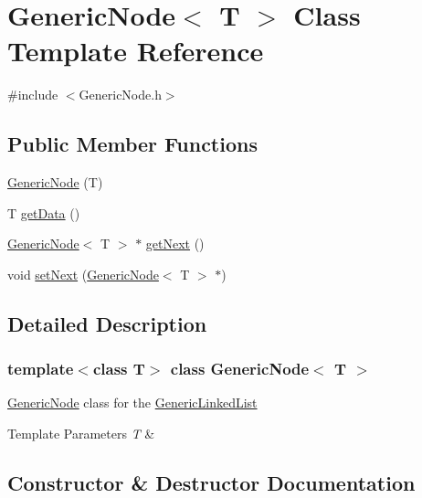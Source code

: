 \hypertarget{class_generic_node}{}\section{Generic\+Node$<$ T $>$ Class Template Reference}
\label{class_generic_node}


{\ttfamily \#include $<$Generic\+Node.\+h$>$}

\subsection*{Public Member Functions}
\begin{DoxyCompactItemize}
\item 
\mbox{\hyperlink{class_generic_node_ac5a803402a095cf8510b10a2574a2481}{Generic\+Node}} (T)
\item 
T \mbox{\hyperlink{class_generic_node_a77f64973b12b7c7e2b6707e0b9e9a464}{get\+Data}} ()
\item 
\mbox{\hyperlink{class_generic_node}{Generic\+Node}}$<$ T $>$ $\ast$ \mbox{\hyperlink{class_generic_node_a0e6e224f6c52b0bf9e09264185e4976a}{get\+Next}} ()
\item 
void \mbox{\hyperlink{class_generic_node_affb24675a4b0b2469360a62fab95e7f7}{set\+Next}} (\mbox{\hyperlink{class_generic_node}{Generic\+Node}}$<$ T $>$ $\ast$)
\end{DoxyCompactItemize}


\subsection{Detailed Description}
\subsubsection*{template$<$class T$>$\newline
class Generic\+Node$<$ T $>$}

\mbox{\hyperlink{class_generic_node}{Generic\+Node}} class for the \mbox{\hyperlink{class_generic_linked_list}{Generic\+Linked\+List}} 
\begin{DoxyTemplParams}{Template Parameters}
{\em T} & \\
\hline
\end{DoxyTemplParams}


\subsection{Constructor \& Destructor Documentation}
\mbox{\label{class_generic_node_ac5a803402a095cf8510b10a2574a2481}} 
